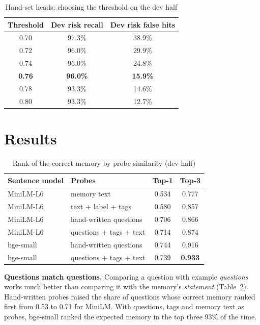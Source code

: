 \documentclass[journal]{IEEEtran}
\begin{document}
\begin{table}[t]
\caption{Hand-set heads: choosing the threshold on the dev half}
\label{tab:hand}
\centering
\footnotesize
\begin{tabular}{@{}ccc@{}}
\toprule
Threshold & Dev risk recall & Dev risk false hits\\
\midrule
0.70 & 97.3\% & 38.9\%\\
0.72 & 96.0\% & 29.9\%\\
0.74 & 96.0\% & 24.8\%\\
\textbf{0.76} & \textbf{96.0\%} & \textbf{15.9\%}\\
0.78 & 93.3\% & 14.6\%\\
0.80 & 93.3\% & 12.7\%\\
\bottomrule
\end{tabular}
\end{table}

\section{Results}\label{sec:results}

\begin{table}[t]
\caption{Rank of the correct memory by probe similarity (dev half)}
\label{tab:ablation}
\centering
\footnotesize
\begin{tabular}{@{}llcc@{}}
\toprule
Sentence model & Probes & Top-1 & Top-3\\
\midrule
MiniLM-L6 \cite{stAllMiniLML6V2} & memory text & 0.534 & 0.777\\
MiniLM-L6 & text + label + tags & 0.580 & 0.857\\
MiniLM-L6 & hand-written questions & 0.706 & 0.866\\
MiniLM-L6 & questions + tags + text & 0.714 & 0.874\\
bge-small & hand-written questions & 0.744 & 0.916\\
bge-small & questions + tags + text & 0.739 & \textbf{0.933}\\
\bottomrule
\end{tabular}
\end{table}

\textbf{Questions match questions.} Comparing a question with example \emph{questions} works much better than comparing it with the memory's
\emph{statement} (Table~\ref{tab:ablation}). Hand-written probes raised the share of questions whose correct memory ranked first from 0.53 to 0.71
for MiniLM. With questions, tags and memory text as probes, bge-small ranked the expected memory in the top three 93\% of the time.
\end{document}
